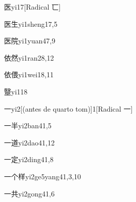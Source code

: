 \begin{verbete}{医}{yi1}{7}[Radical 匸]
\end{verbete}

\begin{verbete}{医生}{yi1sheng1}{7,5}
\end{verbete}

\begin{verbete}{医院}{yi1yuan4}{7,9}
\end{verbete}

\begin{verbete}{依然}{yi1ran2}{8,12}
\end{verbete}

\begin{verbete}{依偎}{yi1wei1}{8,11}
\end{verbete}

\begin{verbete}{毉}{yi1}{18}
\end{verbete}

\begin{verbete}{一}{yi2}[(antes de quarto tom)]{1}[Radical 一]
\end{verbete}

\begin{verbete}{一半}{yi2ban4}{1,5}
\end{verbete}

\begin{verbete}{一道}{yi2dao4}{1,12}
\end{verbete}

\begin{verbete}{一定}{yi2ding4}{1,8}
\end{verbete}

\begin{verbete}{一个样}{yi2ge5yang4}{1,3,10}
\end{verbete}

\begin{verbete}{一共}{yi2gong4}{1,6}
\end{verbete}

